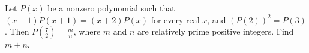 Let $P(x)$ be a nonzero polynomial such that $(x-1)P(x+1)=(x+2)P(x)$ for every real $x$, and $\left(P(2)\right)^2 = P(3)$. Then $P(\tfrac72)=\tfrac{m}{n}$, where $m$ and $n$ are relatively prime positive integers. Find $m + n$.